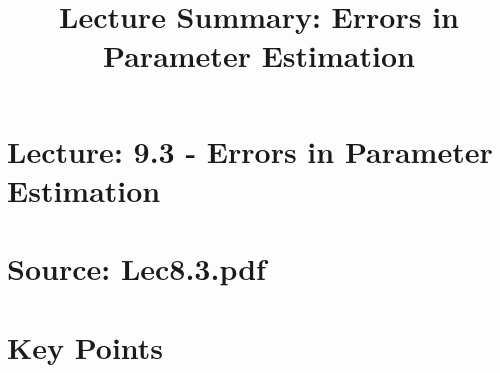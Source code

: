 \documentclass{article}
\title{Lecture Summary: Errors in Parameter Estimation}
\author{}
\date{}
\begin{document}
\maketitle

\section*{Lecture: 9.3 - Errors in Parameter Estimation}
\section*{Source: Lec8.3.pdf}

\section*{Key Points}
\end{document}
